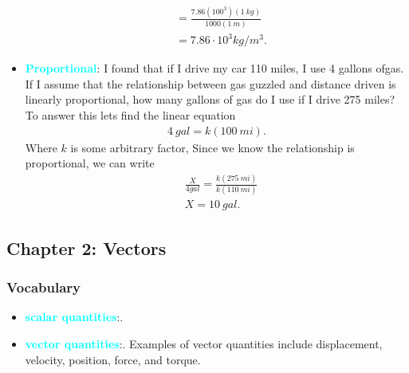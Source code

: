 \documentclass{report}
\begin{document}
\begin{itemize}
\begin{align*}
            &= \frac{7.86(100^{3})(1\ kg)}{1000(1\ m)} \\
            &=7.86 \cdot 10^{3} kg/m^{3}
        .\end{align*}
    \item \textbf{\textcolor{cyan}{Proportional}}: I found that if I drive my car 110 miles, I use 4 gallons ofgas. If I assume that the relationship between gas guzzled and distance driven is linearly proportional, how many gallons of gas do I use if I drive 275 miles?
        \bigbreak \noindent 
        To answer this lets find the linear equation
        \begin{align*}
            4\ gal = k(100\ mi)
        .\end{align*}
        Where $k$ is some arbitrary factor, Since we know the relationship is proportional, we can write 
        \begin{align*}
            &\frac{X}{4 gal} = \frac{k(275\ mi)}{k(110\ mi)} \\
            &X=10\ gal
        .\end{align*}

    \end{itemize}

    \pagebreak 
    \subsection{Chapter 2: Vectors}

    \smallbreak \noindent
    \subsubsection{Vocabulary}
    \begin{itemize}
        \item \textbf{\textcolor{cyan}{scalar quantities}}:.
        \item \textbf{\textcolor{cyan}{vector quantities}}:. Examples of vector quantities include displacement, velocity, position, force, and torque.
    \end{itemize}

    \pagebreak 
\end{document}
